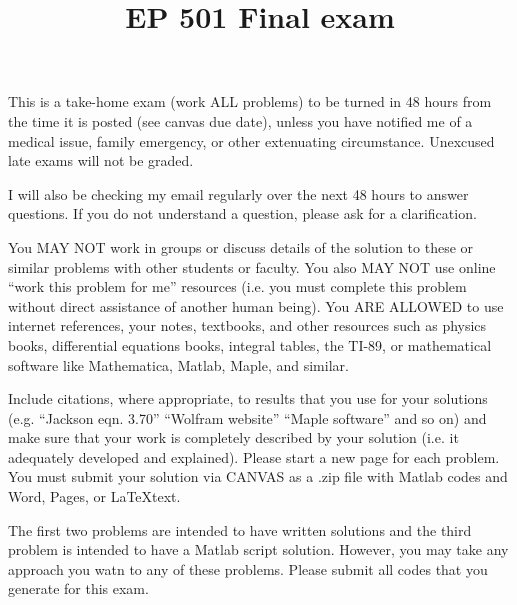 \documentclass{article}
\begin{document}
\title{EP 501 Final exam}

\maketitle

This is a take-home exam (work ALL problems) to be turned in 48 hours from the time it is posted (see canvas due date), unless you have notified me of a medical issue, family emergency, or other extenuating circumstance.  Unexcused late exams will not be graded.  

I will also be checking my email regularly over the next 48 hours to answer questions.  If you do not understand a question, please ask for a clarification.  

You MAY NOT work in groups or discuss details of the solution to these or similar problems with other students or faculty.  You also MAY NOT use online ``work this problem for me'' resources (i.e. you must complete this problem without direct assistance of another human being).  You ARE ALLOWED to use internet references, your notes, textbooks, and other resources such as physics books, differential equations books, integral tables, the TI-89, or mathematical software like Mathematica, Matlab, Maple, and similar.  

Include citations, where appropriate, to results that you use for your solutions (e.g. ``Jackson eqn. 3.70'' ``Wolfram website'' ``Maple software'' and so on) and make sure that your work is completely described by your solution (i.e. it adequately developed and explained).   Please start a new page for each problem.  You must submit your solution via CANVAS as a .zip file with Matlab codes and Word, Pages, or \LaTeX text.

The first two problems are intended to have written solutions and the third problem is intended to have a Matlab script solution.  However, you may take any approach you watn to any of these problems.  Please submit all codes that you generate for this exam.  


\end{document}
